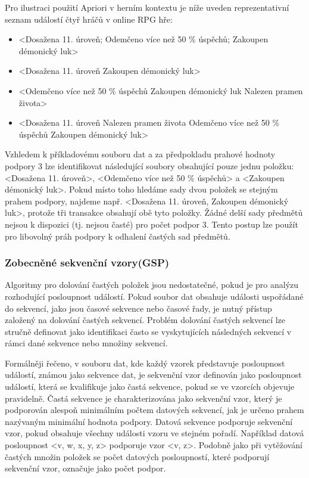 \newpage

Pro ilustraci použití Apriori v herním kontextu je níže uveden reprezentativní seznam událostí čtyř hráčů v online RPG hře:
\begin{itemize}
	\item <Dosažena 11. úroveň; Odemčeno více než 50 \% úspěchů; Zakoupen démonický luk>
	\item <Dosažena 11. úroveň\; Zakoupen démonický luk>
	\item <Odemčeno více než 50 \% úspěchů\; Zakoupen démonický luk\; Nalezen pramen života>
	\item <Dosažena 11. úroveň\; Nalezen pramen života\; Odemčeno více než 50 \% úspěchů\; Zakoupen démonický luk>
\end{itemize}

Vzhledem k příkladovému souboru dat a za předpokladu prahové hodnoty podpory 3 lze identifikovat následující soubory obsahující pouze jednu položku: <Dosažena 11. úroveň>, <Odemčeno více než 50 \% úspěchů> a <Zakoupen démonický luk>. Pokud místo toho hledáme sady dvou položek se stejným prahem podpory, najdeme např. <Dosažena 11. úroveň, Zakoupen démonický luk>, protože tři transakce obsahují obě tyto položky. Žádné delší sady předmětů nejsou k dispozici (tj. nejsou časté) pro počet podpor 3. Tento postup lze použít pro libovolný práh podpory k odhalení častých sad předmětů.

\subsubsection{Zobecněné sekvenční vzory(GSP)}
Algoritmy pro dolování častých položek jsou nedostatečné, pokud je pro analýzu rozhodující posloupnost událostí. Pokud soubor dat obsahuje události uspořádané do sekvencí, jako jsou časové sekvence nebo časové řady, je nutný přístup založený na dolování častých sekvencí. Problém dolování častých sekvencí lze stručně definovat jako identifikaci často se vyskytujících následných sekvencí v rámci dané sekvence nebo množiny sekvencí.

Formálněji řečeno, v souboru dat, kde každý vzorek představuje posloupnost událostí, známou jako sekvence dat, je sekvenční vzor definován jako posloupnost událostí, která se kvalifikuje jako častá sekvence, pokud se ve vzorcích objevuje pravidelně. Častá sekvence je charakterizována jako sekvenční vzor, který je podporován alespoň minimálním počtem datových sekvencí, jak je určeno prahem nazývaným minimální hodnota podpory. Datová sekvence podporuje sekvenční vzor, pokud obsahuje všechny události vzoru ve stejném pořadí. Například datová posloupnost <v, w, x, y, z> podporuje vzor <v, z>. Podobně jako při vytěžování častých množin položek se počet datových posloupností, které podporují sekvenční vzor, označuje jako počet podpor.

